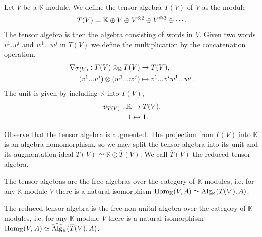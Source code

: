 \documentclass[../thesis.tex]{subfiles}
\begin{document}
            \begin{example}
                Let $V$ be a $\mathbb{K}$-module. We define the tensor algebra $T(V)$ of $V$ as the module
                \begin{align*}
                    T(V) = \mathbb{K}\oplus V\oplus V^{\otimes 2} \oplus V^{\otimes 3} \oplus \cdots\tt{.}
                \end{align*}
                The tensor algebra is then the algebra consisting of words in $V$. Given two words $v^1..v^i$ and $w^1...w^j$ in $T(V)$ we define the multiplication by the concatenation operation,
                \begin{align*}
                    \nabla_{T(V)} : T(V)\otimes_{\mathbb{K}} T(V) & \rightarrow T(V)\tt{,} \\
                    (v^1...v^i)\otimes(w^1...w^j) & \mapsto v^1...v^iw^1...w^j\tt{.}
                \end{align*}
                The unit is given by including $\mathbb{K}$ into $T(V)$,
                \begin{align*}
                    \upsilon_{T(V)} : \mathbb{K} & \rightarrow T(V)\tt{,} \\
                    1 & \mapsto 1\tt{.}
                \end{align*}
            \end{example}

            Observe that the tensor algebra is augmented. The projection from $T(V)$ into $\mathbb{K}$ is an algebra homomorphism, so we may split the tensor algebra into its unit and its augmentation ideal $T(V) \simeq \mathbb{K}\oplus\overline{T}(V)$. We call $\overline{T}(V)$ the reduced tensor algebra.

            \begin{proposition}\label{prop: free-tensor}
                The tensor algebras are the free algebras over the category of $\mathbb{K}$-modules, i.e. for any $\mathbb{K}$-module $V$ there is a natural isomorphism $\tt{Hom}_{\mathbb{K}}(V,A)\simeq \tt{Alg}_{\mathbb{K}}(T(V),A)$.

                The reduced tensor algebra is the free non-unital algebra over the category of $\mathbb{K}$-modules, i.e. for any $\mathbb{K}$-module $V$ there is a natural isomorphism $\tt{Hom}_{\mathbb{K}}(V,A)\simeq \widehat{\tt{Alg}}_{\mathbb{K}}(\overline{T}(V),A)$.
            \end{proposition}
\end{document}
